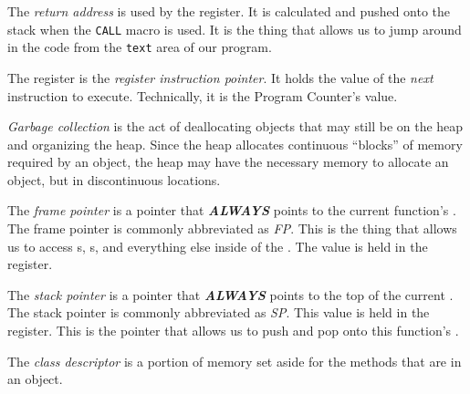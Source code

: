 \begin{definition}\label{def:Return_Address}
  The \emph{return address} is used by the \rip{} register.
  It is calculated and pushed onto the  stack when the \texttt{CALL} macro is used.
  It is the thing that allows us to jump around in the code from the \texttt{text} area of our program.

  \begin{remark}
    The \rip{} register is the \emph{register instruction pointer}.
    It holds the value of the \emph{next} instruction to execute.
    Technically, it is the Program Counter's value.
  \end{remark}
\end{definition}

\begin{definition}\label{def:Garbage_Collection}
  \emph{Garbage collection} is the act of deallocating objects that may still be on the heap and organizing the heap.
  Since the heap allocates continuous ``blocks'' of memory required by an object, the heap may have the necessary memory to allocate an object, but in discontinuous locations.
\end{definition}

\begin{definition}\label{def:Frame_Pointer}
  The \emph{frame pointer} is a pointer that \textbf{\emph{ALWAYS}} points to the current function's .
  The frame pointer is commonly abbreviated as \emph{FP}.
  This is the thing that allows us to access s, s, and everything else inside of the .
  The value is held in the \rbp{} register.
\end{definition}

\begin{definition}\label{def:Stack_Pointer}
  The \emph{stack pointer} is a pointer that \textbf{\emph{ALWAYS}} points to the top of the current .
  The stack pointer is commonly abbreviated as \emph{SP}.
  This value is held in the \rsp{} register.
  This is the pointer that allows us to push and pop onto this function's .
\end{definition}

\begin{definition}\label{def:Class_Descriptor}
  The \emph{class descriptor} is a portion of memory set aside for the methods that are in an object.
\end{definition}

